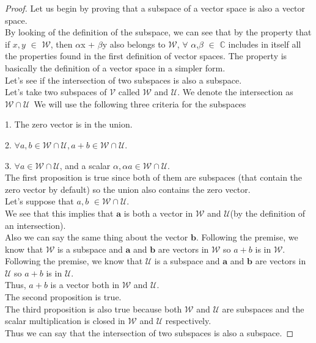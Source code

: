\documentclass[12pt,a4paper]{article}
\begin{document}
\begin{proof}
Let us begin by proving that a subspace of a vector space is also a vector space. \\By looking of the definition of the subspace, we can see that by the property
that if $x, y$ $\in$ $\mathcal{W}$, then $\alpha$x + $\beta$y also belongs to $\mathcal{W}$, $\forall$ $\alpha$,$\beta$ $\in$ $\mathbb{C}$ includes in itself all the properties found in the first definition of vector spaces. The property is basically the definition of a vector space in a simpler form.\\
Let's see if the intersection of two subspaces is also a subspace.\\
Let's take two subspaces of $\mathcal{V}$ called $\mathcal{W}$ and $\mathcal{U}$. We denote the intersection as $\mathcal{W} \cap \mathcal{U}$\
We will use the following three criteria for the subspaces
\item \hspace{1cm} 1. The zero vector is in the union.
\item \hspace{1cm} 2. $\forall a,b \in \mathcal{W} \cap \mathcal{U},  a + b \in \mathcal{W} \cap \mathcal{U}$.
\item \hspace{1cm} 3. $\forall a \in \mathcal{W} \cap \mathcal{U}$, and a scalar $\alpha, \alpha a \in  \mathcal{W} \cap \mathcal{U}$.
\\The first proposition is true since both of them are subspaces (that contain the zero vector by default) so the union also contains the zero vector.\\
Let's suppose that  $a, b$ $\in \mathcal{W} \cap \mathcal{U}$.\\
We see that this implies that $\textbf{a}$ is both a vector in $\mathcal{W}$ and $\mathcal{U}$(by the definition of an intersection).\\
Also we can say the same thing about the vector $\textbf{b}$.
Following the premise, we know that $\mathcal{W}$ is a subspace and $\textbf{a}$ and $\textbf{b}$ are vectors in $\mathcal{W}$ so $a + b$ is in $\mathcal{W}$.\\
Following the premise, we know that $\mathcal{U}$ is a subspace and $\textbf{a}$ and $\textbf{b}$ are vectors in $\mathcal{U}$ so $a + b$ is in $\mathcal{U}$.\\
Thus, $a + b$ is a vector both in $\mathcal{W}$ and $\mathcal{U}$. \\
The second proposition is true.\\
The third proposition is also true because both $\mathcal{W}$ and $\mathcal{U}$ are subspaces and the scalar multiplication is closed in $\mathcal{W}$ and $\mathcal{U}$ respectively.
\\Thus we can say that the intersection of two subspaces is also a subspace.
\end{proof}
\end{document}
